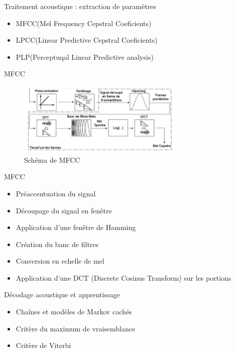 \begin{frame}{Traitement acoustique : extraction de paramètres}
	\begin{itemize}
	\item MFCC(Mel Frequency Cepstral Coeficients)
	\item LPCC(Linear Predictive Cepstral Coeficients)
	\item PLP(Perceptuqal Linear Predictive analysis)
	\end{itemize}
\end{frame}


\begin{frame}{MFCC}

\begin{figure}
\centering
\includegraphics[width=8cm]{images/schema_MFCC.png}
\caption{Schéma de MFCC}
\end{figure}
\end{frame}

\begin{frame}{MFCC}
\begin{itemize}
\item Préaccentuation du signal
\item Découpage du signal en fenêtre
\item Application d’une fenêtre de Hamming
\item Création du banc de filtres
\item Conversion en echelle de mel
\item Application d’une DCT (Discrete Cosinus Transform) sur les portions
\end{itemize}
\end{frame}

\begin{frame}{Décodage acoustique et apprentissage}

\begin{itemize}
\item Chaînes et modèles de Markov cachés  
\item Critère du maximum de vraisemblance
\item Critère de Viterbi
\end{itemize}

\end{frame}

